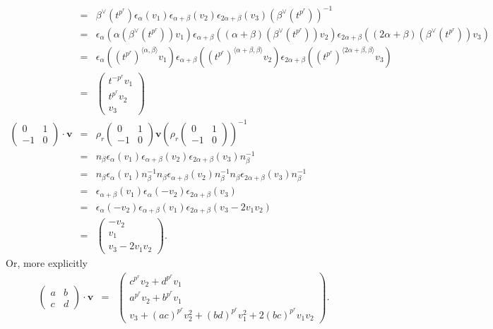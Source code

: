 \begin{eqnarray*}
&=& \beta^\vee(t^{p^r}) \epsilon_\alpha (v_1)
\epsilon_{\alpha+\beta}(v_2)
\epsilon_{2\alpha+\beta}(v_3) (\beta^\vee(t^{p^r}))^{-1} \\
&=& \epsilon_\alpha \left(\alpha(\beta^\vee(t^{p^r}))v_1\right)
\epsilon_{\alpha+\beta} \left((\alpha+\beta)(\beta^\vee(t^{p^r}))v_2 \right)
\epsilon_{2\alpha+\beta} \left((2\alpha+\beta)(\beta^\vee(t^{p^r}))v_3 \right)\\
&=& \epsilon_\alpha \left((t^{p^r})^{\langle \alpha, \beta \rangle}v_1 \right)
\epsilon_{\alpha+\beta} \left((t^{p^r})^{\langle \alpha+\beta, \beta \rangle}v_2 \right)
\epsilon_{2\alpha+\beta} \left((t^{p^r})^{\langle 2\alpha+\beta, \beta \rangle}v_3 \right)\\
&=& \left(\begin{matrix} t^{-p^r}v_1 \\ t^{p^r}v_2\\ v_3 \end{matrix}\right) \\
\left(\begin{matrix} 0 & 1 \\ -1 & 0 \end{matrix}\right) \cdot \mathbf{v} &=&
\rho_r\left(\begin{matrix} 0 & 1 \\ -1 & 0\end{matrix}\right) \mathbf{v}\left( \rho_r\left(\begin{matrix} 0 & 1 \\ -1 & 0\end{matrix}\right)\right)^{-1} \\
&=& n_\beta  \epsilon_\alpha (v_1)\epsilon_{\alpha+\beta}(v_2) \epsilon_{2\alpha+\beta}(v_3) n_\beta^{-1}\\
&=& n_\beta  \epsilon_\alpha (v_1) n_\beta^{-1}n_\beta \epsilon_{\alpha+\beta}(v_2) n_\beta^{-1} n_\beta \epsilon_{2\alpha+\beta}(v_3) n_\beta^{-1}\\
&=& \epsilon_{\alpha+\beta} (v_1) \epsilon_{\alpha}(-v_2)  \epsilon_{2\alpha+\beta}(v_3) \\
&=&\epsilon_{\alpha}(-v_2)  \epsilon_{\alpha+\beta} (v_1)  \epsilon_{2\alpha+\beta}(v_3 - 2v_1v_2) \\
&=& \left(\begin{matrix} -v_2 \\ v_1 \\ v_3 - 2v_1v_2 \end{matrix}\right).
\end{eqnarray*}
Or, more explicitly
\begin{eqnarray*}
\left(\begin{matrix}
a & b \\ c & d
\end{matrix} \right) \cdot \mathbf{v} &=&
\left(\begin{matrix}
c^{p^r}v_2 + d^{p^r}v_1 \\
a^{p^r}v_2 + b^{p^r}v_1 \\
v_3 + (ac)^{p^r}v_2^2 + (bd)^{p^r}v_1^2 + 2(bc)^{p^r}v_1v_2
\end{matrix}\right).
\end{eqnarray*}

